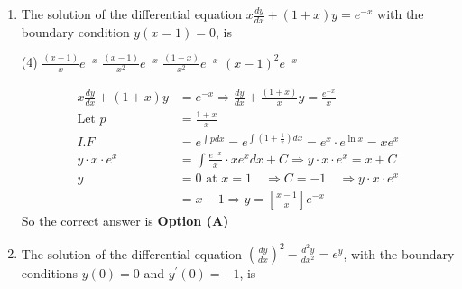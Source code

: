 \begin{enumerate}[label=\color{ocre}\textbf{\arabic*.}]
	{}
	\begin{tasks}(4)
		\task[\textbf{A.}]  $y=\frac{A}{x}+B x^{3}$
		\task[\textbf{B.}] $y=A x+\frac{B}{x^{3}}$
		\task[\textbf{C.}] $y=A x+B x^{3}$
		\task[\textbf{D.}] $y=\frac{A}{x}+\frac{B}{x^{3}}$
	\end{tasks}
	\begin{answer}
		\begin{align*}
		\intertext{
			The given equation is Euler-Cauchy differential equation. The characteristic equation of}
		x^{2} \frac{d^{2} y}{d x^{2}}+5 x \frac{d y}{d x}+6 y&=0\\
		\text{is ,}m^{2}+4 m+6&=0 \Rightarrow m=-3 or m=-1\\
		\text{Thus, }y_{1}&=x^{-1}=\frac{1}{x}\text{ and }y_{2}=x^{2}=\frac{1}{x^{3}}
		\intertext{Therefore the general solution is}
		y&=\frac{A}{x}+\frac{B}{x^{3}}
		\end{align*}
		So the correct answer is \textbf{Option (D)}
	\end{answer}
	\item The solution of the differential equation $x \frac{d y}{d x}+(1+x) y=e^{-x}$ with the boundary condition $y(x=1)=0$, is
	{}
	\begin{tasks}(4)
		\task[\textbf{A.}] $\frac{(x-1)}{x} e^{-x}$
		\task[\textbf{B.}] $\frac{(x-1)}{x^{2}} e^{-x}$
		\task[\textbf{C.}] $\frac{(1-x)}{x^{2}} e^{-x}$
		\task[\textbf{D.}] $(x-1)^{2} e^{-x}$
	\end{tasks}
	\begin{answer}
		\begin{align*}
		x \frac{d y}{d x}+(1+x) y&=e^{-x} \Rightarrow \frac{d y}{d x}+\frac{(1+x)}{x} y=\frac{e^{-x}}{x}\\
		\text{Let }p&=\frac{1+x}{x}\\
		I.F &=e^{\int p d x}=e^{\int\left(1+\frac{1}{x}\right) d x}=e^{x} \cdot e^{\ln x}=x e^{x}\\
		y \cdot x \cdot e^{x}&=\int \frac{e^{-x}}{x} \cdot x e^{x} d x+C \Rightarrow y \cdot x \cdot e^{x}=x+C\\
		y&=0\text{ at }x=1 \quad \Rightarrow C=-1 \quad \Rightarrow y \cdot x \cdot e^{x}\\&=x-1 \Rightarrow y=\left[\frac{x-1}{x}\right] e^{-x}
		\end{align*}
		So the correct answer is \textbf{Option (A)}
	\end{answer}
	\item The solution of the differential equation $\left(\frac{d y}{d x}\right)^{2}-\frac{d^{2} y}{d x^{2}}=e^{y}$, with the boundary conditions $y(0)=0$ and $y^{\prime}(0)=-1$, is

\end{enumerate}
